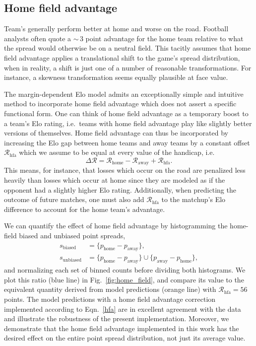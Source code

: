 \documentclass[aps,prc,reprint,amsmath,superscriptaddress]{revtex4-1}
\begin{document}
\subsection{Home field advantage}

Team's generally perform better at home and worse on the road.
Football analysts often quote a ${\sim}\,3$ point advantage for the home team relative to what the spread would otherwise be on a neutral field. 
This tacitly assumes that home field advantage applies a translational shift to the game's spread distribution, when in reality, a shift is just one of a number of reasonable transformations.
For instance, a skewness transformation seems equally plausible at face value.

The margin-dependent Elo model admits an exceptionally simple and intuitive method to incorporate home field advantage which does not assert a specific functional form.
One can think of home field advantage as a temporary boost to a team's Elo rating, i.e.\ teams with home field advantage play like slightly better versions of themselves.  
Home field advantage can thus be incorporated by increasing the Elo gap between home teams and away teams by a constant offset $\mathcal{R}_\text{hfa}$ which we assume to be equal at every value of the handicap, i.e.\
\begin{equation}
  \label{hfa}
  \Delta \mathcal{R} = \mathcal{R}_\text{home} - \mathcal{R}_\text{away} + \mathcal{R}_\text{hfa}.
\end{equation}
This means, for instance, that losses which occur on the road are penalized less heavily than losses which occur at home since they are modeled as if the opponent had a slightly higher Elo rating.
Additionally, when predicting the outcome of future matches, one must also add $\mathcal{R}_\text{hfa}$ to the matchup's Elo difference to account for the home team's advantage.

We can quantify the effect of home field advantage by histogramming the home-field biased and unbiased point spreads,
\begin{align}
  s_\text{biased} &= \{p_\text{home} - p_\text{away}\},\nonumber \\
  s_\text{unbiased} &= \{p_\text{home} - p_\text{away}\} \cup \{p_\text{away} - p_\text{home}\},
\end{align}
and normalizing each set of binned counts before dividing both histograms.
We plot this ratio (blue line) in Fig.~\ref{fig:home_field}, and compare its value to the equivalent quantity derived from model predictions (orange line) with $\mathcal{R}_\text{hfa} = 56$ points.
The model predictions with a home field advantage correction implemented according to Eqn.~\eqref{hfa} are in excellent agreement with the data and illustrate the robustness of the present implementation. 
Moreover, we demonstrate that the home field advantage implemented in this work has the desired effect on the entire point spread distribution, not just its average value. 
\end{document}
